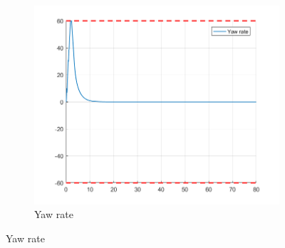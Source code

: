 \documentclass[11pt]{article}
\begin{document}
\begin{enumerate}
\begin{figure}[ht]
\begin{subfigure}[c]{0.3\linewidth}
            \includegraphics[width=\linewidth]{Plots_13_NonlinearModel_Lemniscate/09}
            \caption{Yaw rate}
        \end{subfigure}
        

\end{figure}
\end{enumerate}
\end{document}
